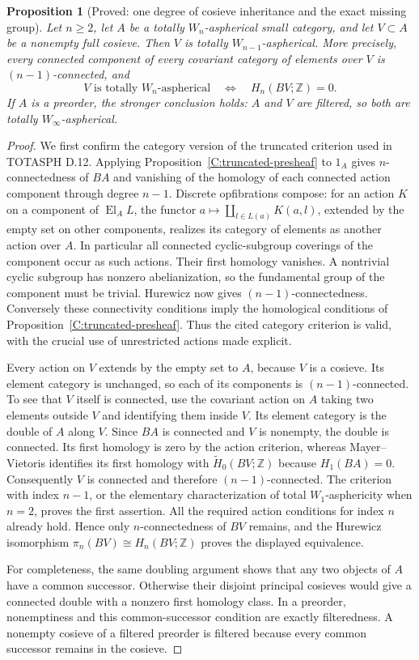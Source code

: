 \documentclass[11pt,a4paper]{article}
\newtheorem{proposition}[theorem]{Proposition}
\theoremstyle{definition}
\theoremstyle{remark}
\begin{document}
\begin{proposition}[Proved: one degree of cosieve inheritance and the exact missing group]\label{C:degree-loss}
Let $n\geq2$, let $A$ be a totally $W_n$-aspherical small category, and let $V\subset A$ be a nonempty full cosieve. Then $V$ is totally $W_{n-1}$-aspherical. More precisely, every connected component of every covariant category of elements over $V$ is $(n-1)$-connected, and
\[
 V\text{ is totally }W_n\text{-aspherical}
 \quad\Longleftrightarrow\quad H_n(BV;\mathbb Z)=0.
\]
If $A$ is a preorder, the stronger conclusion holds: $A$ and $V$ are filtered, so both are totally $W_\infty$-aspherical.
\end{proposition}
\begin{proof}
We first confirm the category version of the truncated criterion used in TOTASPH D.12. Applying Proposition~\ref{C:truncated-presheaf} to $1_A$ gives $n$-connectedness of $BA$ and vanishing of the homology of each connected action component through degree $n-1$. Discrete opfibrations compose: for an action $K$ on a component of $\operatorname{El}_A L$, the functor $a\mapsto\coprod_{l\in L(a)}K(a,l)$, extended by the empty set on other components, realizes its category of elements as another action over $A$. In particular all connected cyclic-subgroup coverings of the component occur as such actions. Their first homology vanishes. A nontrivial cyclic subgroup has nonzero abelianization, so the fundamental group of the component must be trivial. Hurewicz now gives $(n-1)$-connectedness. Conversely these connectivity conditions imply the homological conditions of Proposition~\ref{C:truncated-presheaf}. Thus the cited category criterion is valid, with the crucial use of unrestricted actions made explicit.

Every action on $V$ extends by the empty set to $A$, because $V$ is a cosieve. Its element category is unchanged, so each of its components is $(n-1)$-connected. To see that $V$ itself is connected, use the covariant action on $A$ taking two elements outside $V$ and identifying them inside $V$. Its element category is the double of $A$ along $V$. Since $BA$ is connected and $V$ is nonempty, the double is connected. Its first homology is zero by the action criterion, whereas Mayer--Vietoris identifies its first homology with $\widetilde H_0(BV;\mathbb Z)$ because $H_1(BA)=0$. Consequently $V$ is connected and therefore $(n-1)$-connected. The criterion with index $n-1$, or the elementary characterization of total $W_1$-asphericity when $n=2$, proves the first assertion. All the required action conditions for index $n$ already hold. Hence only $n$-connectedness of $BV$ remains, and the Hurewicz isomorphism $\pi_n(BV)\cong H_n(BV;\mathbb Z)$ proves the displayed equivalence.

For completeness, the same doubling argument shows that any two objects of $A$ have a common successor. Otherwise their disjoint principal cosieves would give a connected double with a nonzero first homology class. In a preorder, nonemptiness and this common-successor condition are exactly filteredness. A nonempty cosieve of a filtered preorder is filtered because every common successor remains in the cosieve.
\end{proof}
\end{document}
